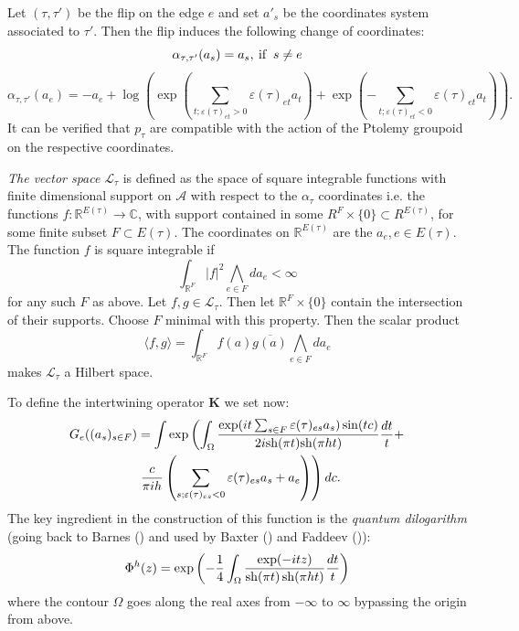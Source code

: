 \documentclass[twoside]{irmaems}
\theoremstyle{plain}
\theoremstyle{definition}
\theoremstyle{remark}
\newcommand{\C}{{\mathbb{C}}}
\newcommand{\R}{{\mathbb{R}}}
\begin{document}
\vspace{0.2cm}
\noindent 
Let  $(\tau,\tau')$ be the flip on the edge $e$ and set $a'_s$ be the coordinates system 
associated to $\tau'$. Then the flip induces the  following 
change of coordinates:  
\[ \alpha_{\tau,\tau'}(a_s)=
a_s, \: \mbox{\rm if }\: s\neq e \]
\[ \alpha_{\tau,\tau'}(a_e)=
-a_e + \log\left(\exp\left(\sum_{t;\varepsilon(\tau)_{et}>0}
\varepsilon(\tau)_{et} a_t\right)+ \exp\left(-\sum_{t;\varepsilon(\tau)_{et}<0}
\varepsilon(\tau)_{et} a_t\right)\right).
\]
It can be verified that $p_{\tau}$ are compatible with the action of the 
Ptolemy groupoid on the respective coordinates. 



\vspace{0.2cm}
\noindent 
{\em The vector space} ${\mathcal L}_{\tau}$ is defined as the space of 
square integrable functions  with finite dimensional support 
on ${\mathcal A}$ with respect to the $\alpha_{\tau}$ coordinates 
i.e. the functions $f:\R^{E(\tau)}\to \C$,  with support contained in 
some $R^F\times \{0\}\subset R^{E(\tau)}$, for some finite subset 
$F\subset E(\tau)$. The coordinates on $\R^{E(\tau)}$ are the $a_e, e\in E(\tau)$. 
The function $f$ is square integrable if 
\[ \int_{\R^F} |f|^2 \bigwedge _{e\in F}da_e  < \infty \]
for any such $F$ as above. Let $f, g \in {\mathcal L}_{\tau}$. Then let 
 $\R^F\times \{0\}$ contain the intersection of their supports. 
Choose $F$ minimal with this property. Then the scalar product 
\[ \langle f, g \rangle= \int_{\R^F} f(a)\overline{g(a)} \bigwedge _{e\in F}da_e \]
makes ${\mathcal L}_{\tau}$ a Hilbert space. 


\vspace{0.2cm}
\noindent 
To define the intertwining operator ${\mathbf K}$ we set now: 
\begin{align*} 
G_e((a_s)_{s\in F}) &=
\int \exp\left(\int_{\Omega}
\frac{\exp(it \sum_{s\in F}\varepsilon(\tau)_{es}a_s) \sin(tc)}
{2i {\rm sh}(\pi t){\rm sh}(\pi h t)} \frac{dt}{t} + \right. \\
& 
\left.\frac{c}{\pi i h}\left(\sum_{s; \varepsilon(\tau)_{es}<0}\varepsilon(\tau)_{es}a_s 
+a_e\right)\right) dc.  
\end{align*}
The key ingredient in the construction of this function is the 
{\em quantum dilogarithm} 
(going back to  Barnes (\cite{Bar}) and 
used by Baxter (\cite{Bax}) and Faddeev (\cite{Fad})): 
\[ \Phi^h(z) = \exp\left(-\frac{1}{4}\int_{\Omega}
\frac{\exp(-it z)}{{\rm sh}(\pi t) \, {\rm sh }(\pi h t)}  \frac{dt}{t} \right)\]
where the contour $\Omega$ goes along the real axes from $-\infty$ 
to $\infty$ bypassing the origin from above. 
\end{document}

